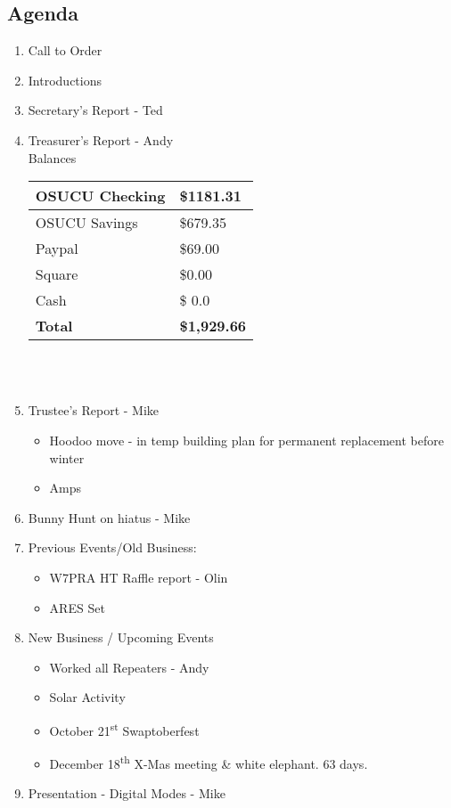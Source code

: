 \documentclass[letter,11pt]{extarticle}
\begin{document}
	\subsection*{Agenda}
	\begin{enumerate}
		\item Call to Order
		\item Introductions
		\item Secretary's Report - Ted
		\item Treasurer's Report - Andy \\
				Balances \\
			\begin{tabular}{|l|l|} \hline
				OSUCU Checking & \$1181.31 \\ \hline
				OSUCU Savings & \$679.35 \\ \hline
				Paypal & \$69.00 \\ \hline
				Square & \$0.00 \\ \hline
				Cash & \$ 0.0 \\ \hline
				\textbf{Total} & \textbf{\$1,929.66} \\ \hline
			\end{tabular} \\ \\
		\item Trustee's Report - Mike
			\begin{itemize}
				\item Hoodoo move - in temp building plan for permanent replacement before winter
				\item Amps
			\end{itemize}
		\item Bunny Hunt on hiatus - Mike
		\item Previous Events/Old Business:
			\begin{itemize}
				\item W7PRA HT Raffle report - Olin
				\item ARES Set
				\end{itemize}
		\item  New Business / Upcoming Events
			\begin{itemize}
				\item Worked all Repeaters - Andy
				\item Solar Activity
				\item October 21\textsuperscript{st} Swaptoberfest
				\item December 18\textsuperscript{th} X-Mas meeting \& white elephant. 63 days.
			\end{itemize}
		\item  Presentation - Digital Modes - Mike
	\end{enumerate}
\end{document}
